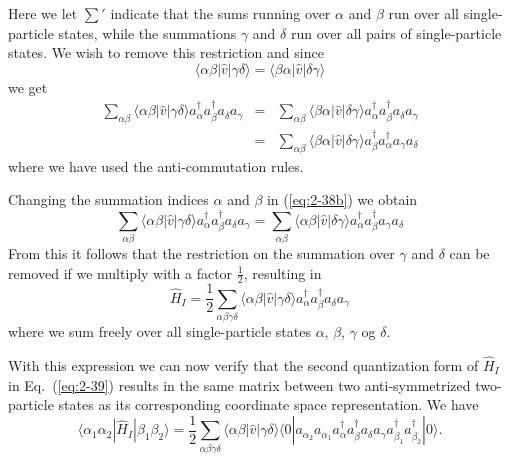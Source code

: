 Here we let $\sum'$ indicate that the sums running over $\alpha$ and $\beta$ run over all
single-particle states, while the summations  $\gamma$ and $\delta$ 
run over all pairs of single-particle states. We wish to remove this restriction and since
\begin{equation}
	\langle \alpha\beta|\hat{v}|\gamma\delta\rangle = \langle \beta\alpha|\hat{v}|\delta\gamma\rangle \label{eq:2-37}
\end{equation}
we get
\begin{align}
	\sum_{\alpha\beta} \langle \alpha\beta|\hat{v}|\gamma\delta\rangle a^{\dagger}_\alpha a^{\dagger}_\beta a_\delta a_\gamma &=& 
		\sum_{\alpha\beta} \langle \beta\alpha|\hat{v}|\delta\gamma\rangle 
		a^{\dagger}_\alpha a^{\dagger}_\beta a_\delta a_\gamma \label{eq:2-38a} \\
	&=& \sum_{\alpha\beta}\langle \beta\alpha|\hat{v}|\delta\gamma\rangle
		a^{\dagger}_\beta a^{\dagger}_\alpha a_\gamma a_\delta \label{eq:2-38b}
\end{align}
where we  have used the anti-commutation rules.

Changing the summation indices 
$\alpha$ and $\beta$ in (\ref{eq:2-38b}) we obtain
\begin{equation}
	\sum_{\alpha\beta} \langle \alpha\beta|\hat{v}|\gamma\delta\rangle a^{\dagger}_\alpha a^{\dagger}_\beta a_\delta a_\gamma =
		 \sum_{\alpha\beta} \langle \alpha\beta|\hat{v}|\delta\gamma\rangle 
		  a^{\dagger}_\alpha a^{\dagger}_\beta  a_\gamma a_\delta \label{eq:2-38c}
\end{equation}
From this it follows that the restriction on the summation over $\gamma$ and $\delta$ can be removed if we multiply with a factor $\frac{1}{2}$, resulting in 
\begin{equation}
	\hat{H}_I = \frac{1}{2} \sum_{\alpha\beta\gamma\delta} \langle \alpha\beta|\hat{v}|\gamma\delta\rangle
		a^{\dagger}_\alpha a^{\dagger}_\beta a_\delta a_\gamma \label{eq:2-39}
\end{equation}
where we sum freely over all single-particle states $\alpha$, 
$\beta$, $\gamma$ og $\delta$.

With this expression we can now verify that the second quantization form of $\hat{H}_I$ in Eq.~(\ref{eq:2-39}) 
results in the same matrix between two anti-symmetrized two-particle states as its corresponding coordinate
space representation. We have  
\begin{equation}
	\langle \alpha_1 \alpha_2|\hat{H}_I|\beta_1 \beta_2\rangle =
		\frac{1}{2} \sum_{\alpha\beta\gamma\delta}
			\langle \alpha\beta|\hat{v}|\gamma\delta\rangle \langle 0|a_{\alpha_2} a_{\alpha_1} 
			 a^{\dagger}_\alpha a^{\dagger}_\beta a_\delta a_\gamma 
			 a_{\beta_1}^{\dagger} a_{\beta_2}^{\dagger}|0\rangle. \label{eq:2-40}
\end{equation}

